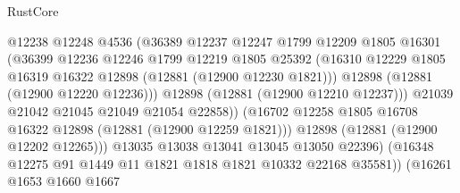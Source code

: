 \begin{lexlean}{RustCore}
\begin{coremodule}
                                      @12238
                                      @12248
                                      @4536
                                      (@36389
                                        @12237
                                        @12247
                                        @1799
                                        @12209
                                        @1805
                                        @16301
                                        (@36399
                                          @12236
                                          @12246
                                          @1799
                                          @12219
                                          @1805
                                          @25392
                                          (@16310
                                            @12229
                                            @1805
                                            @16319
                                            @16322
                                            @12898
                                            (@12881 (@12900 @12230 @1821)))
                                          @12898
                                          (@12881 (@12900 @12220 @12236)))
                                        @12898
                                        (@12881 (@12900 @12210 @12237)))
                                      @21039
                                      @21042
                                      @21045
                                      @21049
                                      @21054
                                      @22858))
                                  (@16702
                                    @12258
                                    @1805
                                    @16708
                                    @16322
                                    @12898
                                    (@12881 (@12900 @12259 @1821)))
                                  @12898
                                  (@12881 (@12900 @12202 @12265)))
                                @13035
                                @13038
                                @13041
                                @13045
                                @13050
                                @22396)
                              (@16348 @12275 @91 @1449 @11 @1821 @1818 @1821 @10332 @22168 @35581))
                            (@16261
                              @1653
                              @1660
                              @1667

\end{coremodule}
\end{lexlean}
